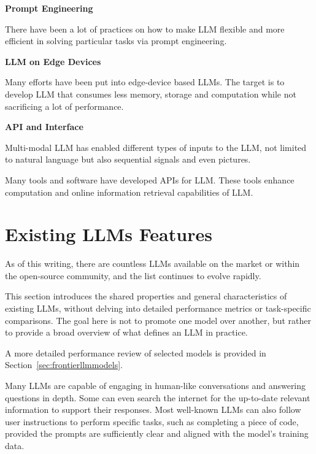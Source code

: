 \vspace{0.1in}
\noindent \textbf{Prompt Engineering}
\vspace{0.1in}

There have been a lot of practices on how to make LLM flexible and more efficient in solving particular tasks via prompt engineering.

\vspace{0.1in}
\noindent \textbf{LLM on Edge Devices}
\vspace{0.1in}

Many efforts have been put into edge-device based LLMs. The target is to develop LLM that consumes less memory, storage and computation while not sacrificing a lot of performance.

\vspace{0.1in}
\noindent \textbf{API and Interface}
\vspace{0.1in}

Multi-modal LLM has enabled different types of inputs to the LLM, not limited to natural language but also sequential signals and even pictures.

Many tools and software have developed APIs for LLM. These tools enhance computation and online information retrieval capabilities of LLM.

\section{Existing LLMs Features}

As of this writing, there are countless LLMs available on the market or within the open-source community, and the list continues to evolve rapidly. 

This section introduces the shared properties and general characteristics of existing LLMs, without delving into detailed performance metrics or task-specific comparisons. The goal here is not to promote one model over another, but rather to provide a broad overview of what defines an LLM in practice.

A more detailed performance review of selected models is provided in Section~\ref{sec:frontierllmmodels}.


Many LLMs are capable of engaging in human-like conversations and answering questions in depth. Some can even search the internet for the up-to-date relevant information to support their responses. Most well-known LLMs can also follow user instructions to perform specific tasks, such as completing a piece of code, provided the prompts are sufficiently clear and aligned with the model's training data.

